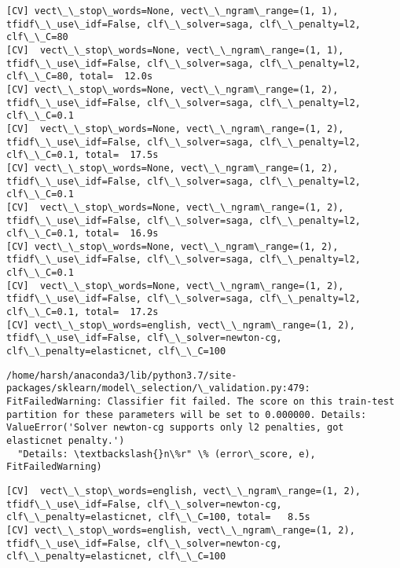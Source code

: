 \documentclass[11pt]{article}
\begin{document}
\begin{Verbatim}[commandchars=\\\{\}]
[CV] vect\_\_stop\_words=None, vect\_\_ngram\_range=(1, 1), tfidf\_\_use\_idf=False, clf\_\_solver=saga, clf\_\_penalty=l2, clf\_\_C=80 
[CV]  vect\_\_stop\_words=None, vect\_\_ngram\_range=(1, 1), tfidf\_\_use\_idf=False, clf\_\_solver=saga, clf\_\_penalty=l2, clf\_\_C=80, total=  12.0s
[CV] vect\_\_stop\_words=None, vect\_\_ngram\_range=(1, 2), tfidf\_\_use\_idf=False, clf\_\_solver=saga, clf\_\_penalty=l2, clf\_\_C=0.1 
[CV]  vect\_\_stop\_words=None, vect\_\_ngram\_range=(1, 2), tfidf\_\_use\_idf=False, clf\_\_solver=saga, clf\_\_penalty=l2, clf\_\_C=0.1, total=  17.5s
[CV] vect\_\_stop\_words=None, vect\_\_ngram\_range=(1, 2), tfidf\_\_use\_idf=False, clf\_\_solver=saga, clf\_\_penalty=l2, clf\_\_C=0.1 
[CV]  vect\_\_stop\_words=None, vect\_\_ngram\_range=(1, 2), tfidf\_\_use\_idf=False, clf\_\_solver=saga, clf\_\_penalty=l2, clf\_\_C=0.1, total=  16.9s
[CV] vect\_\_stop\_words=None, vect\_\_ngram\_range=(1, 2), tfidf\_\_use\_idf=False, clf\_\_solver=saga, clf\_\_penalty=l2, clf\_\_C=0.1 
[CV]  vect\_\_stop\_words=None, vect\_\_ngram\_range=(1, 2), tfidf\_\_use\_idf=False, clf\_\_solver=saga, clf\_\_penalty=l2, clf\_\_C=0.1, total=  17.2s
[CV] vect\_\_stop\_words=english, vect\_\_ngram\_range=(1, 2), tfidf\_\_use\_idf=False, clf\_\_solver=newton-cg, clf\_\_penalty=elasticnet, clf\_\_C=100 

    \end{Verbatim}

    \begin{Verbatim}[commandchars=\\\{\}]
/home/harsh/anaconda3/lib/python3.7/site-packages/sklearn/model\_selection/\_validation.py:479: FitFailedWarning: Classifier fit failed. The score on this train-test partition for these parameters will be set to 0.000000. Details: 
ValueError('Solver newton-cg supports only l2 penalties, got elasticnet penalty.')
  "Details: \textbackslash{}n\%r" \% (error\_score, e), FitFailedWarning)

    \end{Verbatim}

    \begin{Verbatim}[commandchars=\\\{\}]
[CV]  vect\_\_stop\_words=english, vect\_\_ngram\_range=(1, 2), tfidf\_\_use\_idf=False, clf\_\_solver=newton-cg, clf\_\_penalty=elasticnet, clf\_\_C=100, total=   8.5s
[CV] vect\_\_stop\_words=english, vect\_\_ngram\_range=(1, 2), tfidf\_\_use\_idf=False, clf\_\_solver=newton-cg, clf\_\_penalty=elasticnet, clf\_\_C=100 

    \end{Verbatim}
\end{document}
